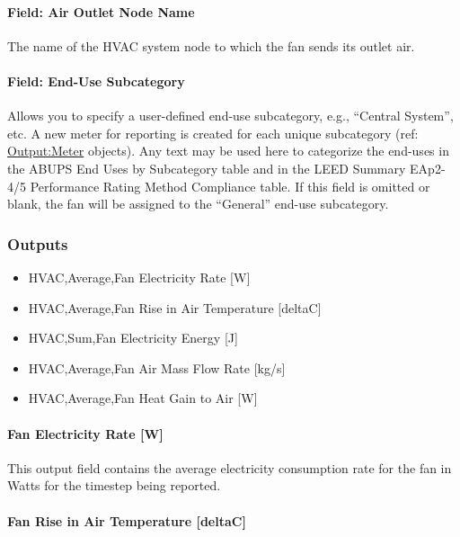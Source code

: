 \paragraph{Field: Air Outlet Node Name}\label{field-air-outlet-node-name-2-000}

The name of the HVAC system node to which the fan sends its outlet air.

\paragraph{Field: End-Use Subcategory}

Allows you to specify a user-defined end-use subcategory, e.g., ``Central System'', etc. A new meter for reporting is created for each unique subcategory (ref: \hyperref[outputmeter-and-outputmetermeterfileonly]{Output:Meter} objects). Any text may be used here to categorize the end-uses in the ABUPS End Uses by Subcategory table and in the LEED Summary EAp2-4/5 Performance Rating Method Compliance table. If this field is omitted or blank, the fan will be assigned to the ``General'' end-use subcategory.

\subsubsection{Outputs}\label{outputs-2-009}

\begin{itemize}
\item
  HVAC,Average,Fan Electricity Rate {[}W{]}
\item
  HVAC,Average,Fan Rise in Air Temperature {[}deltaC{]}
\item
  HVAC,Sum,Fan Electricity Energy {[}J{]}
\item
  HVAC,Average,Fan Air Mass Flow Rate {[}kg/s{]}
\item
  HVAC,Average,Fan Heat Gain to Air {[}W{]}
\end{itemize}

\paragraph{Fan Electricity Rate {[}W{]}}\label{fan-electric-power-w-2}

This output field contains the average electricity consumption rate for the fan in Watts for the timestep being reported.

\paragraph{Fan Rise in Air Temperature {[}deltaC{]}}\label{fan-rise-in-air-temperature-deltac-2}

